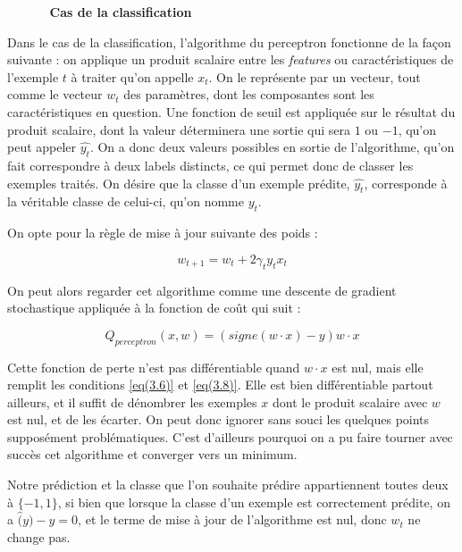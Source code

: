 \documentclass{article}
\begin{document}
\begin{itemize}
\item []
    \begin{itemize}
        \item [\textbf{Cas de la classification}]
    \end{itemize}
\end{itemize}
\bigskip

Dans le cas de la classification, l'algorithme du perceptron fonctionne de la façon suivante : on applique un produit scalaire entre les \emph{features} ou caractéristiques de l'exemple $t$ à traiter qu'on appelle $x_{t}$. On le représente par un vecteur, tout comme le vecteur $w_t$ des paramètres, dont les composantes sont les caractéristiques en question. Une fonction de seuil est appliquée sur le résultat du produit scalaire, dont la valeur déterminera une sortie qui sera $1$ ou $-1$, qu'on peut appeler $\hat{y_t}$. On a donc deux valeurs possibles en sortie de l'algorithme, qu'on fait correspondre à deux labels distincts, ce qui permet donc de classer les exemples traités. On désire que la classe d'un exemple prédite, $\hat{y_t}$, corresponde à la véritable classe de celui-ci, qu'on nomme $y_t$.
\bigskip

On opte pour la règle de mise à jour suivante des poids : 

\begin{equation*}
    w_{t+1} = w_t + 2 \gamma_t y_t x_t
\end{equation*}

On peut alors regarder cet algorithme comme une descente de gradient stochastique appliquée à la fonction de coût qui suit :

\begin{equation*}
    Q_{perceptron}(x, w) = (signe(w \cdot x) - y) w \cdot x
\end{equation*}

Cette fonction de perte n'est pas différentiable quand $w \cdot x$ est nul, mais elle remplit les conditions \eqref{eq(3.6)} et \eqref{eq(3.8)}. Elle est bien différentiable partout ailleurs, et il suffit de dénombrer les exemples $x$ dont le produit scalaire avec $w$ est nul, et de les écarter. 
On peut donc ignorer sans souci les quelques points supposément problématiques. C'est d'ailleurs pourquoi on a pu faire tourner avec succès cet algorithme et converger vers un minimum. 
\bigskip 

Notre prédiction et la classe que l'on souhaite prédire appartiennent toutes deux à $\{-1, 1\}$, si bien que lorsque la classe d'un exemple est correctement prédite, on a $\hat(y) - y = 0$, et le terme de mise à jour de l'algorithme est nul, donc $w_t$ ne change pas. 
\end{document}
